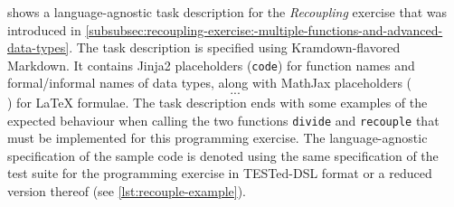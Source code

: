 \documentclass[../main]{subfiles}
\begin{document}
 shows a language-agnostic task description for the \textit{Recoupling} exercise that was introduced in \cref{subsubsec:recoupling-exercise:-multiple-functions-and-advanced-data-types}.
The task description is specified using Kramdown-flavored Markdown.
It contains Jinja2 placeholders (\texttt{{{code}}}) for function names and formal/informal names of data types, along with MathJax placeholders (\texttt{$$...$$}) for \LaTeX{} formulae.
The task description ends with some examples of the expected behaviour when calling the two functions \texttt{divide} and \texttt{recouple} that must be implemented for this programming exercise.
The language-agnostic specification of the sample code is denoted using the same specification of the test suite for the programming exercise in TESTed-DSL format or a reduced version thereof (see \cref{lst:recouple-example}).
\end{document}
